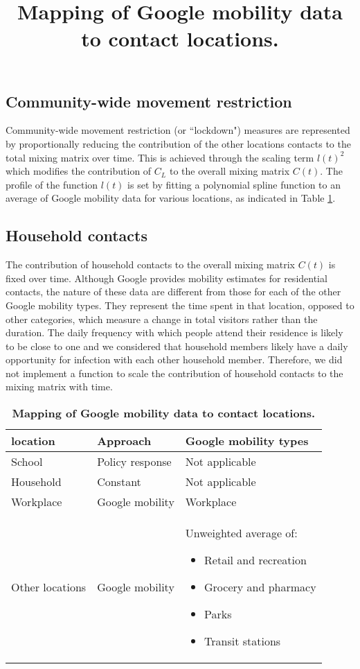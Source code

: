 \subsection{Community-wide movement restriction}
Community-wide movement restriction (or ``lockdown") measures are represented by proportionally reducing the contribution of the other locations contacts to the total mixing matrix over time. This is achieved through the scaling term \(l(t)^{2}\) which modifies the contribution of \(C_{L}\) to the overall mixing matrix \(C(t)\). The profile of the function \(l(t)\) is set by fitting a polynomial spline function to an average of Google mobility data for various locations, as indicated in Table \ref{tab:mobility_map}.

\subsection{Household contacts}
The contribution of household contacts to the overall mixing matrix \(C(t)\) is fixed over time. Although Google provides mobility estimates for residential contacts, the nature of these data are different from those for each of the other Google mobility types. They represent the time spent in that location, opposed to other categories, which measure a change in total visitors rather than the duration. The daily frequency with which people attend their residence is likely to be close to one and we considered that household members likely have a daily opportunity for infection with each other household member. Therefore, we did not implement a function to scale the contribution of household contacts to the mixing matrix with time.

\begin{table}[ht]
\renewcommand{\baselinestretch}{1}
    \begin{tabular}{| p{4.4cm} | p{4.4cm} | p{5cm} |}
        \hline
        \textbf{location} & \textbf{Approach} & \textbf{Google mobility types} \\
        \hline
        School & Policy response & Not applicable \\
      \hline
      Household & Constant & Not applicable \\
      \hline
      Workplace & Google mobility & Workplace \\
      \hline
      Other locations & Google mobility & 
      Unweighted average of: \begin{itemize}
			\item Retail and recreation
          \item Grocery and pharmacy
          \item Parks
          \item Transit stations
      \end{itemize}\\
      \hline
    \end{tabular}
    \title{Mapping of Google mobility data to contact locations.}
    \caption{\textbf{Mapping of Google mobility data to contact locations.}}
    \label{tab:mobility_map}
\end{table}

